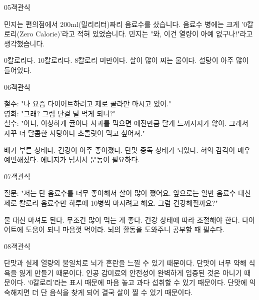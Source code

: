 \documentclass[fs9,seriesFre]{korfarm-base}
\begin{document}
\begin{kfQBlock}{05}{객관식}
\begin{kfEvidence}민지는 편의점에서 200ml(밀리리터)짜리 음료수를 샀습니다. 음료수 병에는 크게 '0칼로리(Zero Calorie)'라고 적혀 있었습니다. 민지는 "와, 이건 열량이 아예 없구나!"라고 생각했습니다.\end{kfEvidence}
\begin{kfChoices}
\kfChoice 0칼로리다.
\kfChoice 10칼로리다.
\kfChoice 8칼로리 미만이다.
\kfChoice 살이 많이 찌는 물이다.
\kfChoice 설탕이 아주 많이 들어있다.
\end{kfChoices}
\end{kfQBlock}
\begin{kfQBlock}{06}{객관식}
\begin{kfEvidence}철수: "나 요즘 다이어트하려고 제로 콜라만 마시고 있어." \\\relax
영희: "그래? 그럼 단걸 덜 먹게 되니?" \\\relax
철수: "아니, 이상하게 귤이나 사과를 먹으면 예전만큼 달게 느껴지지가 않아. 그래서 자꾸 더 달콤한 사탕이나 초콜릿이 먹고 싶어져."\end{kfEvidence}
\begin{kfChoices}
\kfChoice 배가 부른 상태다.
\kfChoice 건강이 아주 좋아졌다.
\kfChoice 단맛 중독 상태가 되었다.
\kfChoice 혀의 감각이 매우 예민해졌다.
\kfChoice 에너지가 넘쳐서 운동이 필요하다.
\end{kfChoices}
\end{kfQBlock}
\begin{kfQBlock}{07}{객관식}
\begin{kfEvidence}질문: "저는 단 음료수를 너무 좋아해서 살이 많이 쪘어요. 앞으로는 일반 음료수 대신 제로 칼로리 음료수만 하루에 10병씩 마시려고 해요. 그럼 건강해질까요?"\end{kfEvidence}
\begin{kfChoices}
\kfChoice 물 대신 마셔도 된다.
\kfChoice 무조건 많이 먹는 게 좋다.
\kfChoice 건강 상태에 따라 조절해야 한다.
\kfChoice 다이어트에 도움이 되니 마음껏 먹어라.
\kfChoice 뇌의 활동을 도와주니 공부할 때 필수다.
\end{kfChoices}
\end{kfQBlock}
\begin{kfQBlock}{08}{객관식}
\begin{kfChoices}
\kfChoice 단맛과 실제 열량의 불일치로 뇌가 혼란을 느낄 수 있기 때문이다.
\kfChoice 단맛이 너무 약해 식욕을 잃게 만들기 때문이다.
\kfChoice 인공 감미료의 안전성이 완벽하게 입증된 것은 아니기 때문이다.
\kfChoice ‘0칼로리’라는 표시 때문에 마음 놓고 과다 섭취할 수 있기 때문이다.
\kfChoice 단맛에 익숙해지면 더 단 음식을 찾게 되어 결국 살이 찔 수 있기 때문이다.
\end{kfChoices}
\end{kfQBlock}
\end{document}
